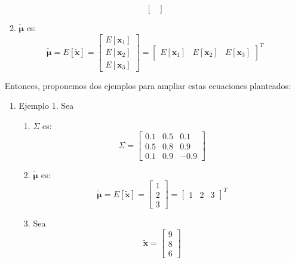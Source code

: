 \begin{problema}
\begin{enumerate}
\begin{sol}
\begin{enumerate}
$$\begin{bmatrix}
            \end{bmatrix}
            $$
            \item $\tilde{\boldsymbol{\mu}}$ es: 
            $$\tilde{\boldsymbol{\mu}}=E[\tilde{\boldsymbol{x}}]=\begin{bmatrix}
                E[\boldsymbol{x}_1]\\
                E[\boldsymbol{x}_2]\\
                E[\boldsymbol{x}_3]
            \end{bmatrix}= \begin{bmatrix}
                E[\boldsymbol{x}_1] &
                E[\boldsymbol{x}_2]&
                E[\boldsymbol{x}_3]
            \end{bmatrix}^T$$
        \end{enumerate}
        Entonces, proponemos dos ejemplos para ampliar estas ecuaciones planteados: 
        \begin{enumerate}
            \item Ejemplo 1. Sea \begin{enumerate}
                \item $\Sigma$ es: 
                $$\Sigma =
                \begin{bmatrix}
                    0.1 & 0.5 & 0.1\\
                    0.5 & 0.8 & 0.9\\
                    0.1 & 0.9 & -0.9
                \end{bmatrix}
                $$
                \item $\tilde{\boldsymbol{\mu}}$ es: 
                $$\tilde{\boldsymbol{\mu}}=E[\tilde{\boldsymbol{x}}]=\begin{bmatrix}
                    1\\
                    2\\
                    3
                \end{bmatrix}= \begin{bmatrix}
                    1 &
                    2&
                    3
                \end{bmatrix}^T$$
                \item Sea $$\tilde{\boldsymbol{x}}= \begin{bmatrix}
                    9\\
                    8\\
                    6
                \end{bmatrix}$$

\end{enumerate}
\end{enumerate}
\end{sol}
\end{enumerate}
\end{problema}
